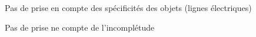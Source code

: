 Pas de prise en compte des spécificités des objets (lignes
électriques)

Pas de prise ne compte de l'incomplétude